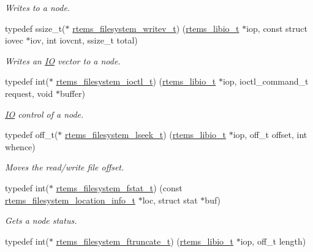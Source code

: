 \begin{DoxyCompactItemize}
\begin{DoxyCompactList}\small\item\em Writes to a node. \end{DoxyCompactList}\item 
typedef ssize\+\_\+t($\ast$ \mbox{\hyperlink{group__LibIOFSHandler_gabdb95b0ef5e3875f0b80cc221edf78f8}{rtems\+\_\+filesystem\+\_\+writev\+\_\+t}}) (\mbox{\hyperlink{structrtems__libio__tt}{rtems\+\_\+libio\+\_\+t}} $\ast$iop, const struct iovec $\ast$iov, int iovcnt, ssize\+\_\+t total)
\begin{DoxyCompactList}\small\item\em Writes an \mbox{\hyperlink{structIO}{IO}} vector to a node. \end{DoxyCompactList}\item 
typedef int($\ast$ \mbox{\hyperlink{group__LibIOFSHandler_ga04ace53d3f0513746d5241dc94c76387}{rtems\+\_\+filesystem\+\_\+ioctl\+\_\+t}}) (\mbox{\hyperlink{structrtems__libio__tt}{rtems\+\_\+libio\+\_\+t}} $\ast$iop, ioctl\+\_\+command\+\_\+t request, void $\ast$buffer)
\begin{DoxyCompactList}\small\item\em \mbox{\hyperlink{structIO}{IO}} control of a node. \end{DoxyCompactList}\item 
typedef off\+\_\+t($\ast$ \mbox{\hyperlink{group__LibIOFSHandler_gab3752ab0473efced7afee0d60c0e2c58}{rtems\+\_\+filesystem\+\_\+lseek\+\_\+t}}) (\mbox{\hyperlink{structrtems__libio__tt}{rtems\+\_\+libio\+\_\+t}} $\ast$iop, off\+\_\+t offset, int whence)
\begin{DoxyCompactList}\small\item\em Moves the read/write file offset. \end{DoxyCompactList}\item 
typedef int($\ast$ \mbox{\hyperlink{group__LibIOFSHandler_gabdbd09354c4e86c79735da3a1dc340a8}{rtems\+\_\+filesystem\+\_\+fstat\+\_\+t}}) (const \mbox{\hyperlink{group__LibIO_ga3252b3d31ee3c49ffff0b7604a676864}{rtems\+\_\+filesystem\+\_\+location\+\_\+info\+\_\+t}} $\ast$loc, struct stat $\ast$buf)
\begin{DoxyCompactList}\small\item\em Gets a node status. \end{DoxyCompactList}\item 
typedef int($\ast$ \mbox{\hyperlink{group__LibIOFSHandler_gaf5cc5b12b8ab1799641171b1649de34b}{rtems\+\_\+filesystem\+\_\+ftruncate\+\_\+t}}) (\mbox{\hyperlink{structrtems__libio__tt}{rtems\+\_\+libio\+\_\+t}} $\ast$iop, off\+\_\+t length)

\end{DoxyCompactItemize}
